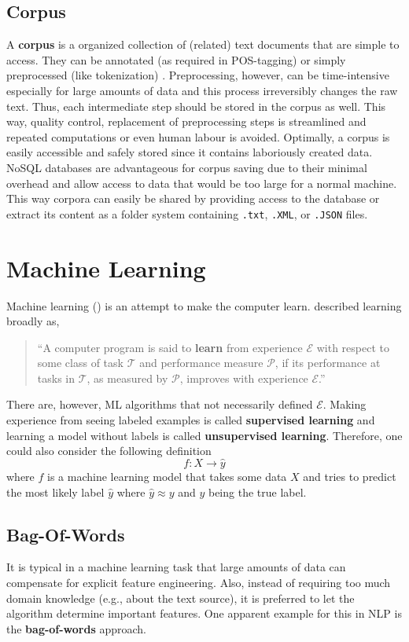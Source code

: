 \subsection{Corpus}
A \textbf{corpus} is a organized collection of (related) text documents that are simple to access. They can be annotated (as required in POS-tagging) or simply preprocessed (like tokenization) \citep{Bengfort2018}.
Preprocessing, however, can be time-intensive especially for large amounts of data and this process irreversibly changes the raw text. Thus, each intermediate step should be stored in the corpus as well. This way, quality control, replacement of preprocessing steps is streamlined and repeated computations or even human labour is avoided.
Optimally, a corpus is easily accessible and safely stored since it contains laboriously created data.
NoSQL databases are advantageous for corpus saving due to their minimal overhead and allow access to data that would be too large for a normal machine.
This way corpora can easily be shared by providing access to the database or extract its content as a folder system containing \texttt{.txt}, \texttt{.XML}, or \texttt{.JSON} files.

\section{Machine Learning}
Machine learning () is an attempt to make the computer learn. \citeauthor{Mitchell1997} described learning broadly as,
%
\begin{quote}
``A computer program is said to \textbf{learn} from experience $\mathcal{E}$ with respect to some class of task $\mathcal{T}$ and performance measure $\mathcal{P}$, if its performance at tasks in $\mathcal{T}$, as measured by $\mathcal{P}$, improves with experience $\mathcal{E}$.''
\end{quote}
%
There are, however, ML algorithms that not necessarily defined $\mathcal{E}$. Making experience from seeing labeled examples is called \textbf{supervised learning} and learning a model without labels is called \textbf{unsupervised learning}. Therefore, one could also consider the following definition  \[f: X \rightarrow \hat{y}\] where $f$ is a machine learning model that takes some data $X$ and tries to predict the most likely label $\hat{y}$ where $\hat{y} \approx y$ and $y$ being the true label.

\subsection{Bag-Of-Words}\label{section:bow}
It is typical in a machine learning task that large amounts of data can compensate for explicit feature engineering.
Also, instead of requiring too much domain knowledge (e.g., about the text source), it is preferred to let the algorithm determine important features.
One apparent example for this in NLP is the \textbf{bag-of-words} approach.

